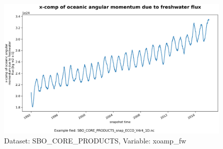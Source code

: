 \begin{figure}[H]
\centering
\includegraphics[scale=0.55]{../images/plots/oneD_plots/SBO_Core_Products/xoamp_fw.png}
\caption{Dataset: SBO\_CORE\_PRODUCTS, Variable: xoamp\_fw}
\label{tab:table-SBO_CORE_PRODUCTS_xoamp_fw-Plot}
\end{figure}
\pagebreak
